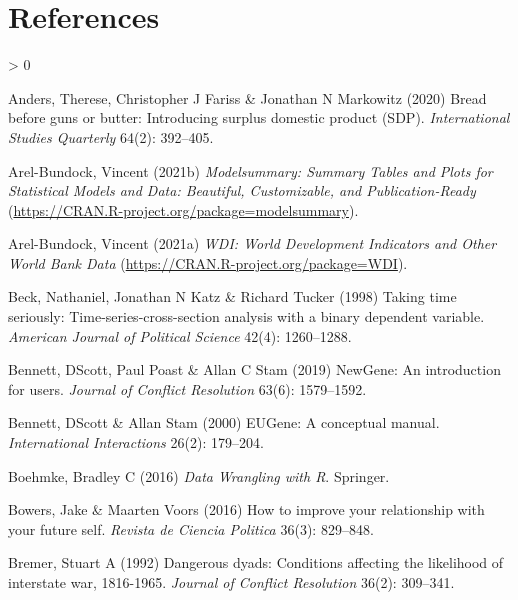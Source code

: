 \documentclass[
  11pt,
]{article}
\newlength{\cslhangindent}
\newenvironment{CSLReferences}[2] %
 {%
  \setlength{\parindent}{0pt}
  \ifodd #1 \everypar{\setlength{\hangindent}{\cslhangindent}}\ignorespaces\fi
  \ifnum #2 > 0
  \setlength{\parskip}{#2\baselineskip}
  \fi
 }%
 {}
\begin{document}
\newpage

\hypertarget{references}{%
\section{References}\label{references}}

\setlength{\parskip}{6pt}

\hypertarget{refs}{}
\begin{CSLReferences}{1}{0}
\leavevmode\hypertarget{ref-andersetal2020bbgb}{}%
Anders, Therese, Christopher J Fariss \& Jonathan N Markowitz (2020) Bread before guns or butter: Introducing surplus domestic product (SDP). \emph{International Studies Quarterly} 64(2): 392--405.

\leavevmode\hypertarget{ref-arelbundock2021m}{}%
Arel-Bundock, Vincent (2021b) \emph{Modelsummary: Summary Tables and Plots for Statistical Models and Data: Beautiful, Customizable, and Publication-Ready} (\url{https://CRAN.R-project.org/package=modelsummary}).

\leavevmode\hypertarget{ref-arelbundock2021w}{}%
Arel-Bundock, Vincent (2021a) \emph{WDI: World Development Indicators and Other World Bank Data} (\url{https://CRAN.R-project.org/package=WDI}).

\leavevmode\hypertarget{ref-becketal1998tts}{}%
Beck, Nathaniel, Jonathan N Katz \& Richard Tucker (1998) Taking time seriously: Time-series-cross-section analysis with a binary dependent variable. \emph{American Journal of Political Science} 42(4): 1260--1288.

\leavevmode\hypertarget{ref-bennettetal2019n}{}%
Bennett, DScott, Paul Poast \& Allan C Stam (2019) NewGene: An introduction for users. \emph{Journal of Conflict Resolution} 63(6): 1579--1592.

\leavevmode\hypertarget{ref-bennettstam2000e}{}%
Bennett, DScott \& Allan Stam (2000) EUGene: A conceptual manual. \emph{International Interactions} 26(2): 179--204.

\leavevmode\hypertarget{ref-boehmke2016dwr}{}%
Boehmke, Bradley C (2016) \emph{Data Wrangling with {R}}. Springer.

\leavevmode\hypertarget{ref-bowersvoors2016hiyr}{}%
Bowers, Jake \& Maarten Voors (2016) How to improve your relationship with your future self. \emph{Revista de Ciencia Politica} 36(3): 829--848.

\leavevmode\hypertarget{ref-bremer1992ddc}{}%
Bremer, Stuart A (1992) Dangerous dyads: Conditions affecting the likelihood of interstate war, 1816-1965. \emph{Journal of Conflict Resolution} 36(2): 309--341.


\end{CSLReferences}
\end{document}
